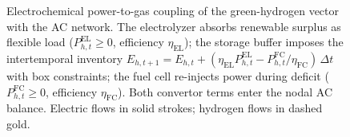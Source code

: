 \begin{figure}[!t]
\centering
\resizebox{0.80\textwidth}{!}{} %
\caption{Electrochemical power-to-gas coupling of the green-hydrogen vector with the AC network. The electrolyzer absorbs renewable surplus as flexible load ($P^{\mathrm{EL}}_{h,t} \ge 0$, efficiency $\eta_{\mathrm{EL}}$); the storage buffer imposes the intertemporal inventory $E_{h,t+1} = E_{h,t} + (\eta_{\mathrm{EL}} P^{\mathrm{EL}}_{h,t} - P^{\mathrm{FC}}_{h,t}/\eta_{\mathrm{FC}})\,\Delta t$ with box constraints; the fuel cell re-injects power during deficit ($P^{\mathrm{FC}}_{h,t} \ge 0$, efficiency $\eta_{\mathrm{FC}}$). Both convertor terms enter the nodal AC balance. Electric flows in solid strokes; hydrogen flows in dashed gold.}
\label{fig:p2g_h2}
\end{figure}
